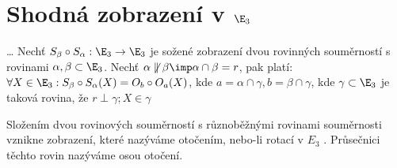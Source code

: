 
\let\braceru=\relax \let\bracelu=\relax 
\def\o#1{\setbox0=
	\hbox{$\kern2pt\overbrace{\kern-2pt#1\kern-2pt}\kern2pt$}\ht0=2.1ex\box0}
\def\to#1{\hbox{#1\rlap{\t{}}}}
\def\rad{\rm{rad}}
\def\f{\frac}
\section{Shodná zobrazení v $\E_3$}
{\Huge\dots}
\V Nechť $S_\beta \circ S_\alpha : \E_3 \rightarrow \E_3$ je
sožené zobrazení dvou rovinných souměrností s rovinami $\alpha,\beta \subset \E_3$. Nechť $\alpha \not\parallel \beta \imp \alpha\cap\beta = r$, pak platí:
$\forall X \in \E_3 : S_\beta \circ S_\alpha (X) = O_b\circ O_a (X)$, kde 
$a=\alpha \cap \gamma,b=\beta\cap\gamma$, kde $\gamma\subset\E_3$ je taková rovina, že $r\perp \gamma;X\in\gamma$


\Def Složením dvou rovinových souměrností s různoběžnými rovinami souměrnosti vznikne
zobrazení, které nazýváme otočením, nebo-li rotací v $E_3$ . Průsečnici těchto rovin
nazýváme osou otočení.

\EndDoc



